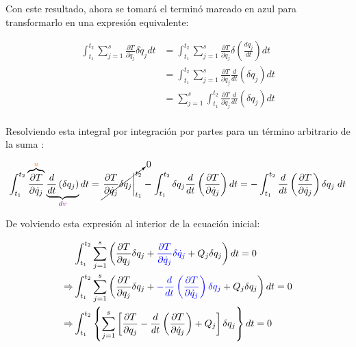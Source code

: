 \documentclass[/home/hernan-barquero/Documents/Apuntes_mecanica_teorica/main.tex]{subfiles}
\begin{document}
    Con este resultado, ahora se tomará el terminó marcado en azul para transformarlo en una expresión equivalente:

    \begin{align*}
        \int_{t_1}^{t_2} \sum_{j=1}^{s} \frac{\partial T}{\partial \dot{q}_{j}} \delta \dot{q}_{j} dt & = \int_{t_1}^{t_2} \sum_{j=1}^{s} \frac{\partial T}{\partial \dot{q}_{j}} \delta \left(\frac{d q_{j}}{d t}\right) dt \\ 
        & = \int_{t_1}^{t_2} \sum_{j=1}^{s} \frac{\partial T}{\partial \dot{q}_{j}} \frac{d}{d t} \left(\delta  q_{j}\right) dt \\ 
        & = \sum_{j=1}^{s} \int_{t_1}^{t_2} \frac{\partial T}{\partial \dot{q}_{j}} \frac{d}{d t} \left(\delta  q_{j}\right) dt \\ 
    \end{align*}

    Resolviendo esta integral por integración por partes para un término arbitrario de la suma :

    \begin{align*}
        \int_{t_1}^{t_2} \overbrace{\frac{\partial T}{\partial \dot{q}_{j}}}^{\textcolor{orange}{u}} \underbrace{\frac{d}{d t} \left(\delta  q_{j}\right)}_{\textcolor{violet}{dv} } dt & = \cancelto{0}{\left.  \frac{\partial T}{\partial \dot{q}_{j}} \delta  q_{j}  \right|_{t_1}^{t_2}} - \int_{t_1}^{t_2}  \delta  q_{j} \frac{d}{d t} \left(\frac{\partial T}{\partial \dot{q}_{j}} \right) dt =  - \int_{t_1}^{t_2}  \frac{d}{d t} \left(\frac{\partial T}{\partial \dot{q}_{j}} \right)  \delta  q_{j}  \; dt \\ 
    \end{align*}

    De volviendo esta expresión al interior de la ecuación inicial:

    \begin{align*}
        & \int_{t_1}^{t_2} \sum_{j=1}^{s}  \left(\frac{\partial T}{\partial q_{j}} \delta q_{j} + \textcolor{blue}{\frac{\partial T}{\partial \dot{q}_{j}} \delta \dot{q}_{j}}   + Q_{j} \delta q_{j} \right) dt = 0 \\ 
        \Rightarrow  & \int_{t_1}^{t_2} \sum_{j=1}^{s}  \left(\frac{\partial T}{\partial q_{j}} \delta q_{j} + \textcolor{blue}{- \frac{d}{d t} \left(\frac{\partial T}{\partial \dot{q}_{j}} \right)  \delta  q_{j}}   + Q_{j} \delta q_{j} \right) dt = 0 \\ 
        \Rightarrow  & \int_{t_1}^{t_2} \left \{ \sum_{j=1}^{s}  \left[\frac{\partial T}{\partial q_{j}}  - \frac{d}{d t} \left(\frac{\partial T}{\partial \dot{q}_{j}} \right)     + Q_{j}  \right] \delta q_{j} \right\}  dt = 0
    \end{align*}
\end{document}
